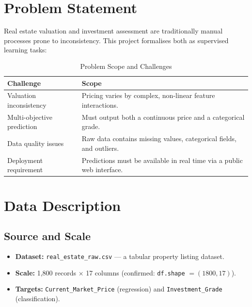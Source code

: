 \documentclass[12pt,a4paper]{article}
\begin{document}
\section{Problem Statement}

Real estate valuation and investment assessment are traditionally manual processes
prone to inconsistency. This project formalises both as supervised learning tasks:

\begin{table}[H]
\centering
\caption{Problem Scope and Challenges}
\begin{tabular}{@{} p{4.5cm} p{9.5cm} @{}}
\toprule
\textbf{Challenge} & \textbf{Scope} \\
\midrule
Valuation inconsistency
  & Pricing varies by complex, non-linear feature interactions. \\
\addlinespace
Multi-objective prediction
  & Must output both a continuous price and a categorical grade. \\
\addlinespace
Data quality issues
  & Raw data contains missing values, categorical fields, and outliers. \\
\addlinespace
Deployment requirement
  & Predictions must be available in real time via a public web interface. \\
\bottomrule
\end{tabular}
\end{table}

\section{Data Description}

\subsection{Source and Scale}

\begin{itemize}[noitemsep]
  \item \textbf{Dataset:} \texttt{real\_estate\_raw.csv} --- a tabular property
        listing dataset.
  \item \textbf{Scale:} 1,800 records $\times$ 17 columns
        (confirmed: \texttt{df.shape} $= (1800, 17)$).
  \item \textbf{Targets:} \texttt{Current\_Market\_Price} (regression) and
        \texttt{Investment\_Grade} (classification).
\end{itemize}
\end{document}
